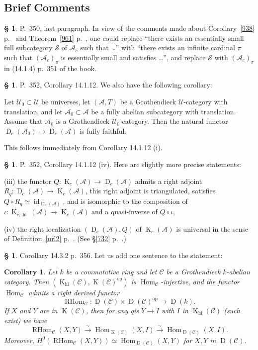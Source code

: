 \documentclass[12pt]{article}
\newtheorem{cor}[thm]{Corollary}
\theoremstyle{remark}
\theoremstyle{definition}
\newtheorem{s}[thm]{\S}
\newcommand{\nn}{\noindent}
\newcommand{\cc}{\mathcal}
\newcommand{\oo}{\operatorname}
\newcommand{\A}{\mathcal A}
\newcommand{\C}{\mathcal C}
\newcommand{\U}{\mathcal U}
\newcommand{\xr}{\xrightarrow}
\DeclareMathOperator{\D}{D}
\DeclareMathOperator{\id}{id}
\DeclareMathOperator{\Hom}{Hom}
\DeclareMathOperator{\op}{op}
\begin{document}

\subsection{Brief Comments}

\begin{s} 
P.~350, last paragraph. In view of the comments made about Corollary~\ref{938} p.~\pageref{938} and Theorem~\ref{961} p.~\pageref{961}, one could replace ``there exists an essentially small full subcategory $\cc S$ of $\A_c$ such that \dots'' with ``there exists an infinite cardinal $\pi$ such that $(\A_c)_\pi$ is essentially small and satisfies \dots'', and replace $\cc S$ with $(\A_c)_\pi$ in (14.1.4) p.~351 of the book.
\end{s}

%

\begin{s}\label{14112}
P.~352, Corollary 14.1.12. We also have the following corollary: 

Let $\U_0\subset\U$ be universes, let $(\A,T)$ be a Grothendieck $\U$-category with translation, and let $\A_0\subset\A$ be a fully abelian subcategory with translation. Assume that $\A_0$ is a Grothendieck $\U_0$-category. Then the natural functor $\D_c(\A_0)\to\D_c(\A)$ is fully faithful.

This follows immediately from Corollary 14.1.12 (i). 
\end{s}

%

\begin{s} 
P.~352, Corollary 14.1.12 (iv). Here are slightly more precise statements:

\nn(iii) the functor $Q:\oo K_c(\A)\to\oo D_c(\A)$ admits a right adjoint $R_q:\oo D_c(\A)\to\oo K_c(\A)$, this right adjoint is triangulated, satisfies $Q\circ R_q\simeq\id_{\oo D_c(\A)}$, and is isomorphic to the composition of $\iota:\oo K_{c,\oo{hi}}(\A)\to\oo K_c(\A)$ and a quasi-inverse of $Q\circ\iota$,

\nn(iv) the right localization $(\oo D_c(\A),Q)$ of $\oo K_c(\A)$ is universal in the sense of Definition~\ref{url2} p.~\pageref{url2}. (See \S\ref{732} p.~\pageref{732}.)
\end{s}

%

\begin{s}
Corollary 14.3.2 p.~356. Let us add one sentence to the statement:
%
\begin{cor}\label{1432}
Let $k$ be a commutative ring and let $\C$ be a Grothendieck $k$-abelian category. Then $(\oo K_{\oo{hi}}(\C),\oo K(\C)^{\op})$ is $\Hom_\C$-injective, and the functor $\Hom_\C$ admits a right derived functor 
$$
\oo{RHom}_\C:\oo D(\C)\times\oo D(\C)^{\op}\to\oo D(k).
$$ 
If $X$ and $Y$ are in $\oo K(\C)$, then for any qis $Y\to I$ with $I$ in $\oo K_{\oo{hi}}(\C)$ (such exist) we have 
$$
\oo{RHom}_\C(X,Y)\xr\sim\Hom_{\oo K(\C)}(X,I)\xr\sim\Hom_{\oo D(\C)}(X,I).
$$ 
Moreover, $H^0(\oo{RHom}_\C(X,Y))\simeq\Hom_{\oo D(\C)}(X,Y)$ for $X,Y$ in $\oo D(\C)$.
\end{cor}
\end{s}
\end{document}
